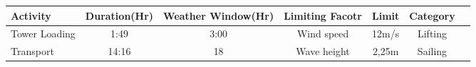 \begin{table}
\label{tab:Sampleinputparameters}
\begin{tabular}{lcccccc}
\hline
Activity & Duration(Hr) & Weather Window(Hr)& Limiting Facotr & Limit & Category \\
\hline 
Tower Loading & 1:49 & 3:00 & Wind speed & 12m/s & Lifting \\
Transport  & 14:16 & 18 & Wave height & 2,25m & Sailing \\

\hline
\end{tabular}
\end{table}




